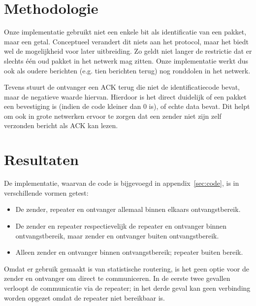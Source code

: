 \documentclass[a4paper,10pt]{article}
\begin{document}
\section{Methodologie}
Onze implementatie gebruikt niet een enkele bit als identificatie van een pakket, maar een getal. Conceptueel verandert dit niets aan het protocol, maar het biedt wel de mogelijkheid voor later uitbreiding. Zo geldt niet langer de restrictie dat er slechts \'e\'en oud pakket in het netwerk mag zitten. Onze implementatie werkt dus ook als oudere berichten (e.g. tien berichten terug) nog ronddolen in het netwerk.

Tevens stuurt de ontvanger een ACK terug die niet de identificatiecode bevat, maar de negatieve waarde hiervan. Hierdoor is het direct duidelijk of een pakket een bevestiging is (indien de code kleiner dan 0 is), of echte data bevat. Dit helpt om ook in grote netwerken ervoor te zorgen dat een zender niet zijn zelf verzonden bericht als ACK kan lezen.

\section{Resultaten}
De implementatie, waarvan de code is bijgevoegd in appendix~\ref{sec:code}, is in verschillende vormen getest:
\begin{itemize}
	\item De zender, repeater en ontvanger allemaal binnen elkaars ontvangstbereik.
	\item De zender en repeater respectievelijk de repeater en ontvanger binnen ontvangstbereik, maar zender en ontvanger buiten ontvangstbereik.
	\item Alleen zender en ontvanger binnen ontvangstbereik; repeater buiten bereik.
\end{itemize}
Omdat er gebruik gemaakt is van statistische routering, is het geen optie voor de zender en ontvanger om direct te communiceren. In de eerste twee gevallen verloopt de communicatie via de repeater; in het derde geval kan geen verbinding worden opgezet omdat de repeater niet bereikbaar is.
\end{document}
